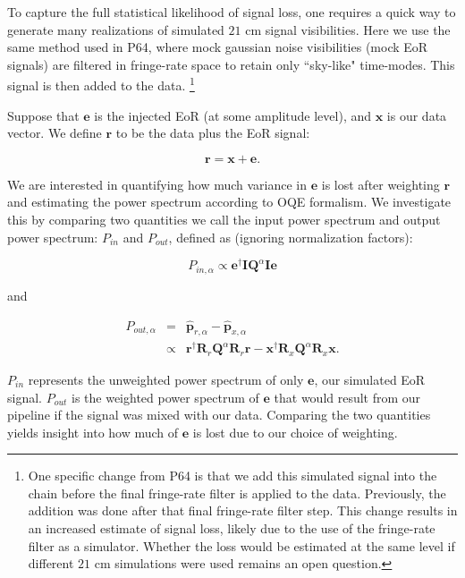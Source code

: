 \documentclass[preprint2,numberedappendix,tighten]{aastex6}  %
\begin{document}
To capture the full statistical likelihood of signal loss, one requires a quick way to generate many realizations of simulated $21$ cm signal visibilities. Here we use the same method used in P64, where mock gaussian noise visibilities (mock EoR signals) are filtered in fringe-rate space to retain only ``sky-like" time-modes. This signal is then added to the data.  \footnote{One specific change from P64 is that we add this simulated signal into the chain before the final fringe-rate filter is applied to the data. Previously, the addition was done after that final fringe-rate filter step.  This change results in an increased estimate of signal loss, likely due to the use of the fringe-rate filter as a simulator. Whether the loss would be estimated at the same level if different $21$ cm simulations were used remains an open question.}

Suppose that $\textbf{e}$ is the injected EoR (at some amplitude level), and $\textbf{x}$ is our data vector. We define $\textbf{r}$ to be the data plus the EoR signal:

\begin{equation}
\textbf{r} = \textbf{x} + \textbf{e}.
\end{equation}

We are interested in quantifying how much variance in $\textbf{e}$ is lost after weighting $\textbf{r}$ and estimating the power spectrum according to OQE formalism. We investigate this by comparing two quantities we call the input power spectrum and output power spectrum: $P_{in}$ and $P_{out}$, defined as (ignoring normalization factors): 

\begin{equation}
\label{eq:Pin}
P_{in,\alpha} \propto \textbf{e}^{\dagger}\textbf{I}\textbf{Q}^{\alpha}\textbf{I}\textbf{e}
\end{equation}

\noindent and

\begin{eqnarray}
\label{eq:sigloss}
P_{out,\alpha} &=& \hat{\textbf{p}}_{r,\alpha}-\hat{\textbf{p}}_{x,\alpha} \nonumber \\
&\propto& \textbf{r}^{\dagger}\textbf{R}_{r}\textbf{Q}^{\alpha}\textbf{R}_{r}\textbf{r} - \textbf{x}^{\dagger}\textbf{R}_{x}\textbf{Q}^{\alpha}\textbf{R}_{x}\textbf{x}.
\end{eqnarray}

$P_{in}$ represents the unweighted power spectrum of only $\textbf{e}$, our simulated EoR signal. $P_{out}$ is the weighted power spectrum of $\textbf{e}$ that would result from our pipeline if the signal was mixed with our data. Comparing the two quantities yields insight into how much of $\textbf{e}$ is lost due to our choice of weighting. 
\end{document}
